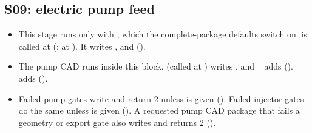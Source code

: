 \subsection{S09: electric pump feed}\label{sec:df-s09}
\begin{itemize}
  \item This stage runs only with , which the complete-package defaults switch on.  is called at  (;  at ). It writes ,  and  ().
  \item The \leavevmode{} pump CAD runs inside this block.  (called at ) writes , and ~ adds  ().  adds  ().
  \item Failed pump gates write  and return 2 unless  is given (). Failed injector gates do the same unless  is given (). A requested pump CAD package that fails a geometry or export gate also writes  and returns 2 ().
\end{itemize}

